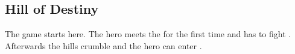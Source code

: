 \subsection{Hill of Destiny}
\label{map:hill_of_destiny}

The game starts here. The hero meets the  for the first time and has to fight . Afterwards the hills crumble and the hero can enter .
